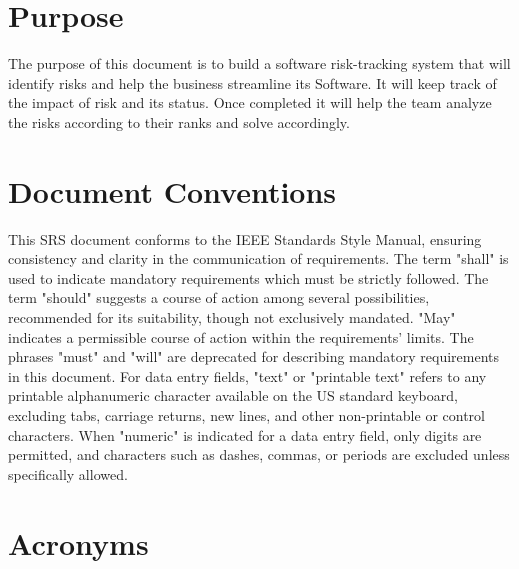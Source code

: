 \documentclass[letterpaper,12pt,oneside,listof=totoc]{scrreprt}
\begin{document}
\section{Purpose}
   The purpose of this document is to build a software risk-tracking system that will identify risks and help the business streamline its Software. It will keep track of the impact of risk and its status. Once completed it will help the team analyze the risks according to their ranks and solve accordingly.                 \setlength{\parskip}{0em}
\section{Document Conventions}
    This SRS document conforms to the IEEE Standards Style Manual, ensuring consistency and clarity in the communication of requirements. The term "shall" is used to indicate mandatory requirements which must be strictly followed. The term "should" suggests a course of action among several possibilities, recommended for its suitability, though not exclusively mandated. "May" indicates a permissible course of action within the requirements' limits. The phrases "must" and "will" are deprecated for describing mandatory requirements in this document. For data entry fields, "text" or "printable text" refers to any printable alphanumeric character available on the US standard keyboard, excluding tabs, carriage returns, new lines, and other non-printable or control characters. When "numeric" is indicated for a data entry field, only digits are permitted, and characters such as dashes, commas, or periods are excluded unless specifically allowed.
    \setlength{\parskip}{0em}

\section{Acronyms} 
\end{document}
